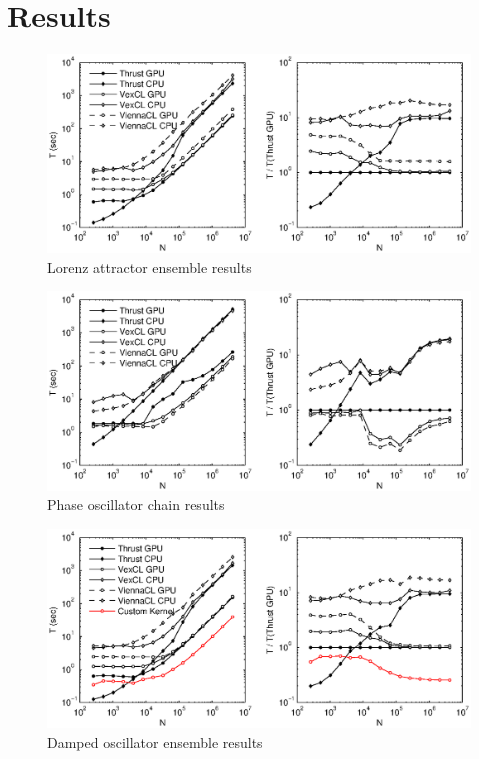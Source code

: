 \documentclass[1p]{elsarticle}
\begin{document}
\section{Results}

\begin{figure}
    \begin{center}
	\includegraphics[width=\textwidth]{data/lorenz_ensemble/perfcmp}
    \end{center}
    \caption{Lorenz attractor ensemble results}
    \label{fig:lorenz:perf}
\end{figure}

\begin{figure}
    \begin{center}
	\includegraphics[width=\textwidth]{data/phase_oscillator_chain/perfcmp}
    \end{center}
    \caption{Phase oscillator chain results}
    \label{fig:phase:perf}
\end{figure}

\begin{figure}
    \begin{center}
	\includegraphics[width=\textwidth]{data/damped_oscillator/perfcmp}
    \end{center}
    \caption{Damped oscillator ensemble results}
    \label{fig:phase:perf}
\end{figure}
\end{document}
